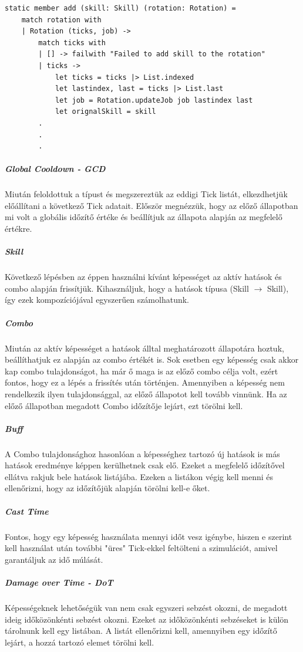 \documentclass[12pt]{article}
\begin{document}
\begin{lstlisting}
static member add (skill: Skill) (rotation: Rotation) =
	match rotation with
	| Rotation (ticks, job) ->
		match ticks with
		| [] -> failwith "Failed to add skill to the rotation"
		| ticks ->
			let ticks = ticks |> List.indexed
			let lastindex, last = ticks |> List.last
			let job = Rotation.updateJob job lastindex last
			let orignalSkill = skill
		.
		.
		.
\end{lstlisting}

\subparagraph{Global Cooldown - GCD} 
Miután feloldottuk a típust és megszereztük az eddigi Tick listát, elkezdhetjük előállítani a következő Tick adatait.
Először megnézzük, hogy az előző állapotban mi volt a globális időzítő értéke és beállítjuk az állapota alapján az megfelelő értékre.

\subparagraph{Skill}
Következő lépésben az éppen használni kívánt képességet az aktív hatások és combo alapján frissítjük. Kihasználjuk, hogy a hatások típusa (Skill $\rightarrow$ Skill), így ezek kompozíciójával egyszerűen számolhatunk.

\subparagraph{Combo}
Miután az aktív képességet a hatások álltal meghatározott állapotára hoztuk, beállíthatjuk ez alapján az combo értékét is. Sok esetben egy képesség csak akkor kap combo tulajdonságot, ha már ő maga is az előző combo célja volt, ezért fontos, hogy ez a lépés a frissítés után történjen.
Amennyiben a képesség nem rendelkezik ilyen tulajdonsággal, az előző állapotot kell tovább vinnünk. Ha az előző állapotban megadott Combo időzítője lejárt, ezt törölni kell.

\subparagraph{Buff}
A Combo tulajdonsághoz hasonlóan a képességhez tartozó új hatások is más hatások eredménye képpen kerülhetnek csak elő. Ezeket a megfelelő időzítővel ellátva rakjuk bele hatások listájába.
Ezeken a listákon végig kell menni és ellenőrizni, hogy az időzítőjük alapján törölni kell-e őket. 

\subparagraph{Cast Time}
Fontos, hogy egy képesség használata mennyi időt vesz igénybe, hiszen e szerint kell használat után további "üres" Tick-ekkel feltölteni a szimulációt, amivel garantáljuk az idő múlását.

\subparagraph{Damage over Time - DoT}
Képességeknek lehetőségük van nem csak egyszeri sebzést okozni, de megadott ideig időközönkénti sebzést okozni. Ezeket az időközönkénti sebzéseket is külön tárolnunk kell egy listában.
A listát ellenőrizni kell, amennyiben egy időzítő lejárt, a hozzá tartozó elemet törölni kell.
\end{document}
